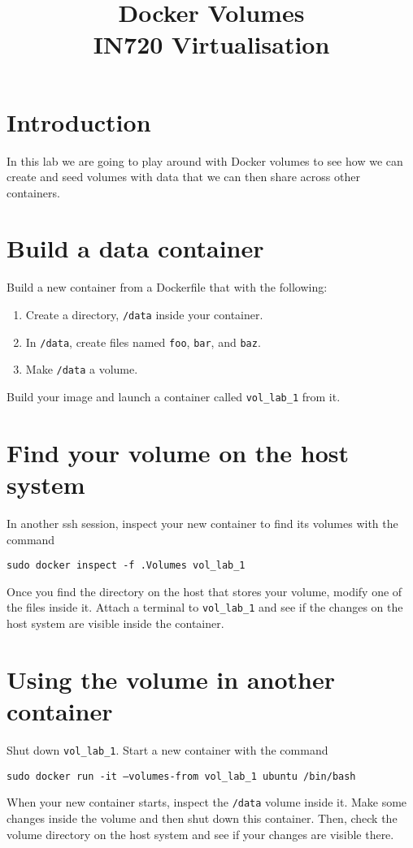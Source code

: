 \documentclass{article}
\begin{document}
\title{Docker Volumes\\ IN720 Virtualisation}
\date{}
\maketitle

\section*{Introduction}
In this lab we are going to play around with Docker volumes to see how we can create and seed volumes with data that we can then share across other containers.


\section{Build a data container}
Build a new container from a Dockerfile that with the following:

\begin{enumerate}
	\item Create a directory, \texttt{/data} inside your container.
	\item In \texttt{/data}, create files named \texttt{foo}, \texttt{bar}, and \texttt{baz}.
	\item Make \texttt{/data} a volume.
\end{enumerate}

Build your image and launch a container called \texttt{vol\_lab\_1} from it.


\section{Find your volume on the host system}
In another ssh session, inspect your new container to find its volumes with the command

\texttt{sudo docker inspect -f {{.Volumes}} vol\_lab\_1}

Once you find the directory on the host that stores your volume, modify one of the files inside it.  Attach a terminal to \texttt{vol\_lab\_1} and see if the changes on the host system are visible inside the container.

\section{Using the volume in another container}
Shut down \texttt{vol\_lab\_1}.  Start a new container with the command

\texttt{sudo docker run -it  --volumes-from vol\_lab\_1 ubuntu /bin/bash}

When your new container starts, inspect the \texttt{/data} volume inside it.  Make some changes inside the volume and then shut down this container.  Then, check the volume directory on the host system and see if your changes are visible there.
\end{document}
